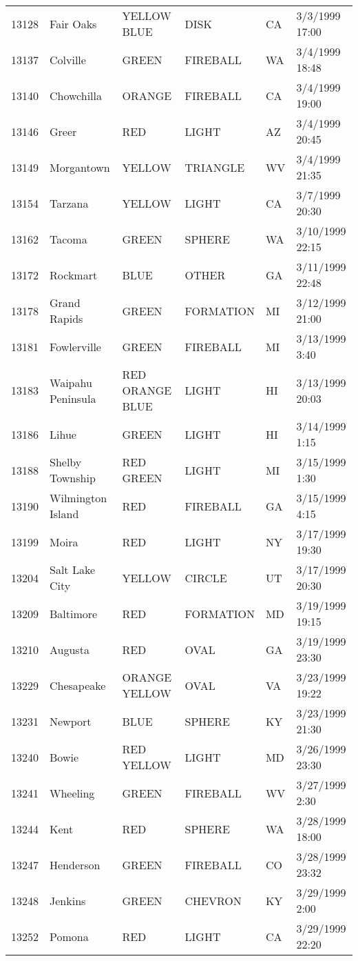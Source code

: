 \begin{tabular}{llllll}
13128 & Fair Oaks & YELLOW BLUE & DISK & CA & 3/3/1999 17:00 \\
13137 & Colville & GREEN & FIREBALL & WA & 3/4/1999 18:48 \\
13140 & Chowchilla & ORANGE & FIREBALL & CA & 3/4/1999 19:00 \\
13146 & Greer & RED & LIGHT & AZ & 3/4/1999 20:45 \\
13149 & Morgantown & YELLOW & TRIANGLE & WV & 3/4/1999 21:35 \\
13154 & Tarzana & YELLOW & LIGHT & CA & 3/7/1999 20:30 \\
13162 & Tacoma & GREEN & SPHERE & WA & 3/10/1999 22:15 \\
13172 & Rockmart & BLUE & OTHER & GA & 3/11/1999 22:48 \\
13178 & Grand Rapids & GREEN & FORMATION & MI & 3/12/1999 21:00 \\
13181 & Fowlerville & GREEN & FIREBALL & MI & 3/13/1999 3:40 \\
13183 & Waipahu Peninsula & RED ORANGE BLUE & LIGHT & HI & 3/13/1999 20:03 \\
13186 & Lihue & GREEN & LIGHT & HI & 3/14/1999 1:15 \\
13188 & Shelby Township & RED GREEN & LIGHT & MI & 3/15/1999 1:30 \\
13190 & Wilmington Island & RED & FIREBALL & GA & 3/15/1999 4:15 \\
13199 & Moira & RED & LIGHT & NY & 3/17/1999 19:30 \\
13204 & Salt Lake City & YELLOW & CIRCLE & UT & 3/17/1999 20:30 \\
13209 & Baltimore & RED & FORMATION & MD & 3/19/1999 19:15 \\
13210 & Augusta & RED & OVAL & GA & 3/19/1999 23:30 \\
13229 & Chesapeake & ORANGE YELLOW & OVAL & VA & 3/23/1999 19:22 \\
13231 & Newport & BLUE & SPHERE & KY & 3/23/1999 21:30 \\
13240 & Bowie & RED YELLOW & LIGHT & MD & 3/26/1999 23:30 \\
13241 & Wheeling & GREEN & FIREBALL & WV & 3/27/1999 2:30 \\
13244 & Kent & RED & SPHERE & WA & 3/28/1999 18:00 \\
13247 & Henderson & GREEN & FIREBALL & CO & 3/28/1999 23:32 \\
13248 & Jenkins & GREEN & CHEVRON & KY & 3/29/1999 2:00 \\
13252 & Pomona & RED & LIGHT & CA & 3/29/1999 22:20 \\

\end{tabular}
